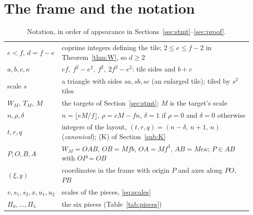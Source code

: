 \documentclass[11pt,reqno]{amsart}
\theoremstyle{plain}
\theoremstyle{definition}
\begin{document}
\section{The frame and the notation}\label{sec:frame}
\begin{table}[ht]
\centering\small
\caption{Notation, in order of appearance in Sections~\ref{sec:stmt}--\ref{sec:proof}.}\label{tab:notation}
\begin{tabular}{@{}p{3.0cm}p{9.5cm}@{}}
\toprule
$e<f$, $d=f-e$ & coprime integers defining the tile; $2\le e\le f-2$ in Theorem~\ref{thm:W}, so $d\ge2$\\
$a,b,c,\kappa$ & $ef,\ f^2-e^2,\ f^2,\ 2f^2-e^2$: tile sides and $b+c$\\
scale $s$ & a triangle with sides $sa,sb,sc$ (an enlarged tile); tiled by $s^2$ tiles\\
$W_M$, $T_M$, $M$ & the targets of Section~\ref{sec:stmt}; $M$ is the target's scale\\
$n,\rho,\delta$ & $n=\lfloor eM/f\rfloor$, $\rho=eM-fn$, $\delta=1$ if $\rho=0$ and $\delta=0$ otherwise\\
$t,r,q$ & integers of the layout, $(t,r,q)=(n-\delta,\,n+1,\,n)$ (\emph{canonical}); (K) of Section~\ref{sub:K}\\
$P,O,B,A$ & $W_M=OAB$, $OB=Mfb$, $OA=Mf^3$, $AB=Me\kappa$; $P\in AB$ with $OP=OB$\\
$(\xi,y)$ & coordinates in the frame with origin $P$ and axes along $PO$, $PB$\\
$v,s_1,s_2,x,u_1,u_2$ & scales of the pieces, \eqref{eq:scales}\\
$\Pi_0,\dots,\Pi_5$ & the six pieces (Table~\ref{tab:pieces})\\
\bottomrule
\end{tabular}
\end{table}
\end{document}
